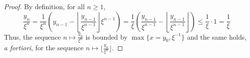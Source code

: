 \begin{proof}
	By definition, for all $n\geq 1$,
	\[
		\frac{y_n}{\xi^n} = \frac{1}{\xi^n} \left(y_{n-1} - \left\lfloor \frac{y_{n-1}}{\xi^{n-1}} \right\rfloor \xi^{n-1}\right)
    = \frac{1}{\xi} \left(\frac{y_{n-1}}{\xi^{n-1}} - \left\lfloor \frac{y_{n-1}}{\xi^{n-1}} \right\rfloor\right)
    \le \frac{1}{\xi}\cdot 1
    = \frac{1}{\xi}
  \]
  Thus, the sequence $n\mapsto \frac{y_n}{\xi^n}$ is bounded by $\max\{x=y_0,\xi^{-1}\}$
  and the same holds, \emph{a fortiori}, for the sequence $n\mapsto \lfloor\frac{y_n}{\xi^n}\rfloor$. 
\end{proof}

%

%
%

